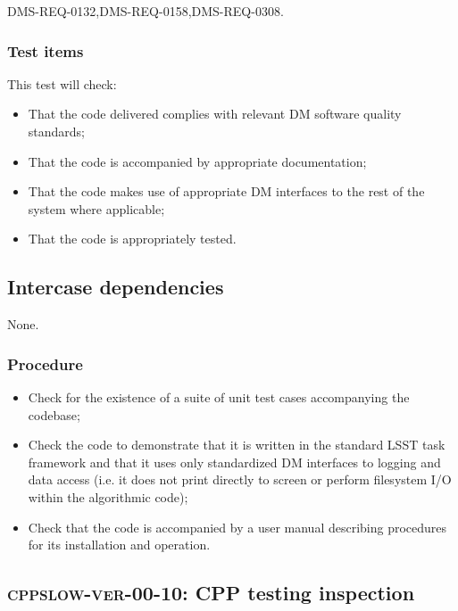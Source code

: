 \documentclass[DM,lsstdraft,STS,toc]{lsstdoc}
\begin{document}
DMS-REQ-0132,DMS-REQ-0158,DMS-REQ-0308.

\subsubsection{Test items}

This test will check:

\begin{itemize}

  \item{That the code delivered complies with relevant DM software quality
  standards;}

  \item{That the code is accompanied by appropriate documentation;}

  \item{That the code makes use of appropriate DM interfaces to the rest of
  the system where applicable;}

  \item{That the code is appropriately tested.}
\end{itemize}

\subsection{Intercase dependencies}

None.

\subsubsection{Procedure}

\begin{itemize}

  \item{Check for the existence of a suite of unit test cases accompanying the
  codebase;}

  \item{Check the code to demonstrate that it is written in the standard LSST
  task framework and that it uses only standardized DM interfaces to logging
  and data access (i.e. it does not print directly to screen or perform
  filesystem I/O within the algorithmic code);}

  \item{Check that the code is accompanied by a user manual describing
  procedures for its installation and operation.}

\end{itemize}


\subsection{\textsc{cppslow-ver-00-10}: CPP testing inspection}
\label{cppslow-ver-00-10}
\end{document}

